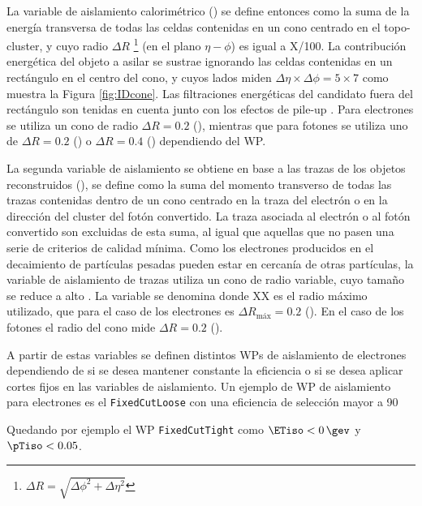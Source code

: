 La variable de aislamiento calorimétrico \cite{PERF-2017-01} () se define entonces como la suma de la energía transversa de todas las celdas contenidas en un cono centrado en el topo-cluster, y cuyo radio $\Delta R$ \footnote{$\Delta R=\sqrt{\Delta\phi^2+\Delta\eta^2}$} (en el plano $\eta-\phi$) es igual a X/100. La contribución energética del objeto a asilar se sustrae ignorando las celdas contenidas en un rectángulo en el centro del cono, y cuyos lados miden $\Delta\eta\times\Delta\phi = 5 \times 7$ como muestra la Figura \ref{fig:IDcone}. Las filtraciones energéticas del candidato fuera del rectángulo son tenidas en cuenta junto con los efectos de pile-up \cite{Cacciari_2008}. Para electrones se utiliza un cono de radio $\Delta R = 0.2$ (), mientras que para fotones se utiliza uno de $\Delta R = 0.2$ () o $\Delta R = 0.4$ () dependiendo del WP.



La segunda variable de aislamiento se obtiene en base a las trazas de los objetos reconstruidos (), se define como la suma del momento transverso de todas las trazas contenidas dentro de un cono centrado en la traza del electrón o en la dirección del cluster del fotón convertido. La traza asociada al electrón o al fotón convertido son excluidas de esta suma, al igual que aquellas que no pasen una serie de criterios de calidad mínima. Como los electrones producidos en el decaimiento de partículas pesadas pueden estar en cercanía de otras partículas, la variable de aislamiento de trazas utiliza un cono de radio variable, cuyo tamaño se reduce a alto \pt. La variable se denomina  donde XX es el radio máximo utilizado, que para el caso de los electrones es $\Delta R_{\text{máx}} = 0.2$ (). En el caso de los fotones el radio del cono mide $\Delta R = 0.2$ ().


A partir de estas variables se definen distintos WPs de aislamiento de electrones dependiendo de si se desea mantener constante la eficiencia o si se desea aplicar cortes fijos en las variables de aislamiento. Un ejemplo de WP de aislamiento para electrones es el \texttt{FixedCutLoose} con una eficiencia de selección mayor a 90

 
Quedando por ejemplo el WP \texttt{FixedCutTight} como $\ETiso<0\,\gev$ y $\pTiso<0.05$.




